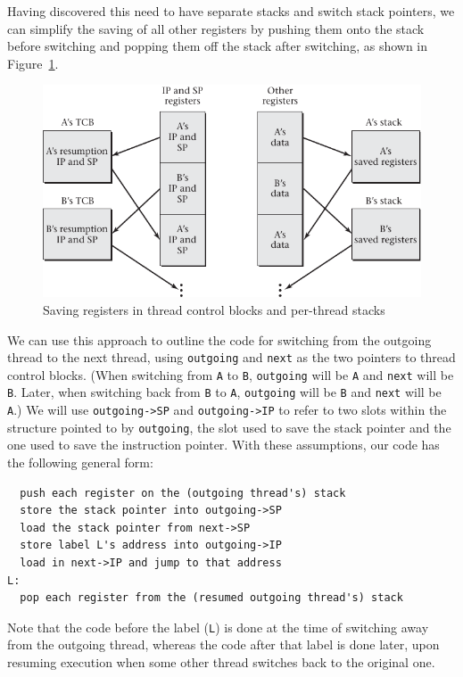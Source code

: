 Having discovered this need to have separate stacks and switch stack
pointers, we can simplify the saving of all other registers by
pushing them onto the stack before switching and popping them off the
stack after switching, as shown in Figure~\ref{scan-2-6}.
\begin{figure}
\centerline{\includegraphics{hail_f0208}}
\caption{Saving registers in thread control blocks and per-thread stacks}
\label{scan-2-6}
\end{figure}
We can use this approach to outline the
code for switching from the outgoing thread to the next
thread, using \verb|outgoing| and \verb|next| as
the two pointers to thread control blocks.
(When switching from \verb|A| to \verb|B|, \verb|outgoing| will be
\verb|A| and \verb|next| will be \verb|B|.  Later, when switching back
from \verb|B| to \verb|A|, \verb|outgoing| will be \verb|B| and
\verb|next| will be \verb|A|.)
We will use
\verb|outgoing->SP| and \verb|outgoing->IP| to refer to two slots within the
structure pointed to by \verb|outgoing|, the slot used to save the stack
pointer and the one used to save the instruction pointer.  With these
assumptions, our code has the following general form:
\begin{verbatim}
  push each register on the (outgoing thread's) stack
  store the stack pointer into outgoing->SP
  load the stack pointer from next->SP
  store label L's address into outgoing->IP
  load in next->IP and jump to that address
L:
  pop each register from the (resumed outgoing thread's) stack
\end{verbatim}
Note that the code before the label (\verb|L|) is done at the time of
switching away from the outgoing thread, whereas the code after that
label is done later, upon resuming execution when some other thread
switches back to the original one.

